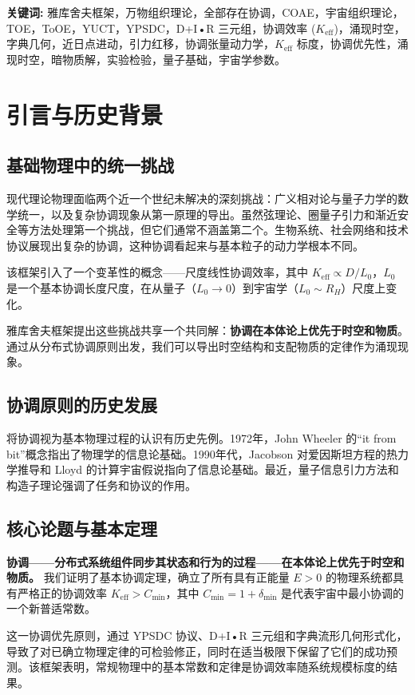 \documentclass[11pt,a4paper]{article}
\begin{document}
	\noindent\textbf{关键词:} 雅库舍夫框架，万物组织理论，全部存在协调，COAE，宇宙组织理论，TOE，ToOE，YUCT，YPSDC，D+I•R 三元组，协调效率 ($K_{\mathrm{eff}}$)，涌现时空，字典几何，近日点进动，引力红移，协调张量动力学，$K_{\mathrm{eff}}$ 标度，协调优先性，涌现时空，暗物质解，实验检验，量子基础，宇宙学参数。
	\newpage
	\tableofcontents
	
	\newpage
	
	\section{引言与历史背景}
	\subsection{基础物理中的统一挑战}
	现代理论物理面临两个近一个世纪未解决的深刻挑战：广义相对论与量子力学的数学统一，以及复杂协调现象从第一原理的导出。虽然弦理论、圈量子引力和渐近安全等方法处理第一个挑战，但它们通常不涵盖第二个。生物系统、社会网络和技术协议展现出复杂的协调，这种协调看起来与基本粒子的动力学根本不同。
	
	该框架引入了一个变革性的概念——尺度线性协调效率，其中 $K_{\mathrm{eff}} \propto D/L_0$，$L_0$ 是一个基本协调长度尺度，在从量子（$L_0 \to 0$）到宇宙学（$L_0 \sim R_H$）尺度上变化。
	
	雅库舍夫框架提出这些挑战共享一个共同解：\textbf{协调在本体论上优先于时空和物质}。通过从分布式协调原则出发，我们可以导出时空结构和支配物质的定律作为涌现现象。
	
	\subsection{协调原则的历史发展}
	将协调视为基本物理过程的认识有历史先例。1972年，John Wheeler 的“it from bit”概念指出了物理学的信息论基础。1990年代，Jacobson 对爱因斯坦方程的热力学推导和 Lloyd 的计算宇宙假说指向了信息论基础。最近，量子信息引力方法和构造子理论强调了任务和协议的作用。
	
	\subsection{核心论题与基本定理}
	
	\textbf{协调——分布式系统组件同步其状态和行为的过程——在本体论上优先于时空和物质。} 我们证明了基本协调定理，确立了所有具有正能量 $E>0$ 的物理系统都具有严格正的协调效率 $K_{\mathrm{eff}} > C_{\min}$，其中 $C_{\min} = 1 + \delta_{\min}$ 是代表宇宙中最小协调的一个新普适常数。
	
	这一协调优先原则，通过 YPSDC 协议、D+I•R 三元组和字典流形几何形式化，导致了对已确立物理定律的可检验修正，同时在适当极限下保留了它们的成功预测。该框架表明，常规物理中的基本常数和定律是协调效率随系统规模标度的结果。
	
\end{document}

